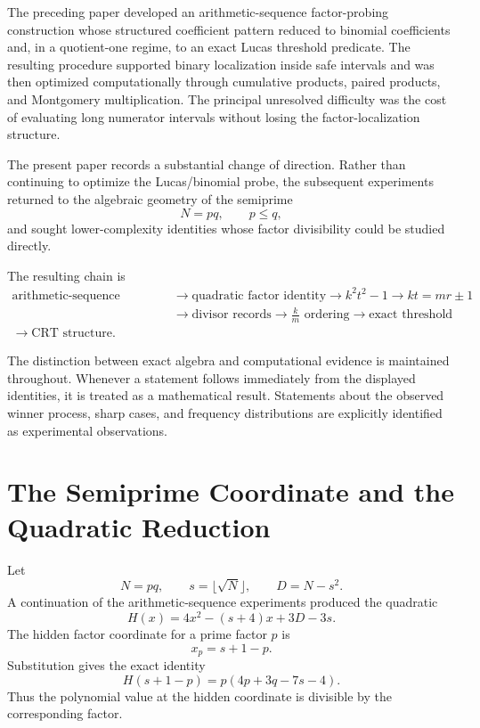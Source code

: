 \documentclass[11pt,a4paper]{article}
\begin{document}
The preceding paper developed an arithmetic-sequence factor-probing construction whose structured coefficient pattern reduced to binomial coefficients and, in a quotient-one regime, to an exact Lucas threshold predicate. The resulting procedure supported binary localization inside safe intervals and was then optimized computationally through cumulative products, paired products, and Montgomery multiplication. The principal unresolved difficulty was the cost of evaluating long numerator intervals without losing the factor-localization structure.

The present paper records a substantial change of direction. Rather than continuing to optimize the Lucas/binomial probe, the subsequent experiments returned to the algebraic geometry of the semiprime
\[
    N=pq,
    \qquad p\le q,
\]
and sought lower-complexity identities whose factor divisibility could be studied directly.

The resulting chain is
\[
\begin{aligned}
\text{arithmetic-sequence construction}
&\longrightarrow
\text{quadratic factor identity}
\longrightarrow
k^2t^2-1
\longrightarrow
kt=mr\pm1
\\
&\longrightarrow
\text{divisor records}
\longrightarrow
\frac{k}{m}\text{ ordering}
\longrightarrow
\text{exact threshold}
\\
\longrightarrow
\text{CRT structure}.
\end{aligned}
\]

The distinction between exact algebra and computational evidence is maintained throughout. Whenever a statement follows immediately from the displayed identities, it is treated as a mathematical result. Statements about the observed winner process, sharp cases, and frequency distributions are explicitly identified as experimental observations.

\section{The Semiprime Coordinate and the Quadratic Reduction}

Let
\[
    N=pq,
    \qquad
    s=\lfloor\sqrt N\rfloor,
    \qquad
    D=N-s^2.
\]
A continuation of the arithmetic-sequence experiments produced the quadratic
\[
    H(x)=4x^2-(s+4)x+3D-3s.
\]
The hidden factor coordinate for a prime factor $p$ is
\[
    x_p=s+1-p.
\]
Substitution gives the exact identity
\begin{equation}
    H(s+1-p)=p(4p+3q-7s-4).
\end{equation}
Thus the polynomial value at the hidden coordinate is divisible by the corresponding factor.
\end{document}
